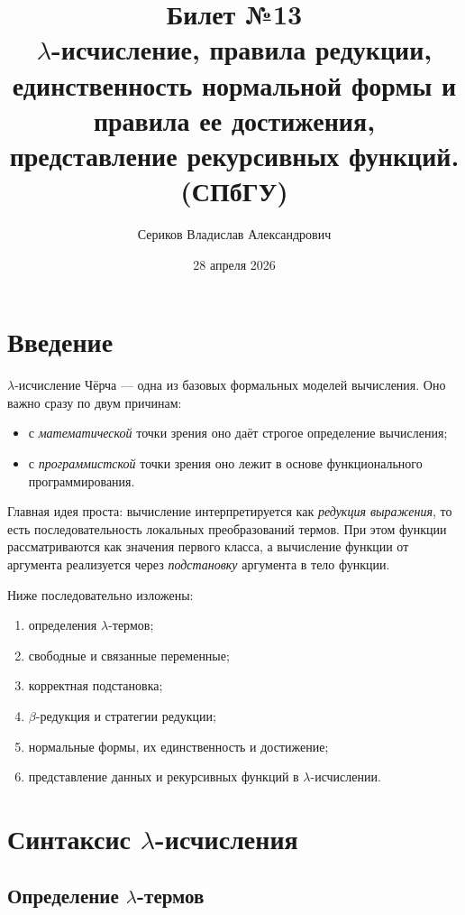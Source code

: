 \documentclass[12pt,a4paper]{article}
\title{Билет №13 \\ \small $\lambda$-исчисление, правила редукции, единственность нормальной формы и правила ее достижения, представление рекурсивных функций. (СПбГУ)}
\author{Сериков Владислав Александрович}
\date{28 апреля 2026}
\theoremstyle{remark}
\begin{document}
\maketitle
\tableofcontents
\newpage

\section*{Введение}

$\lambda$-исчисление Чёрча --- одна из базовых формальных моделей вычисления.
Оно важно сразу по двум причинам:

\begin{itemize}
    \item с \emph{математической} точки зрения оно даёт строгое определение вычисления;
    \item с \emph{программистской} точки зрения оно лежит в основе функционального программирования.
\end{itemize}

Главная идея проста: вычисление интерпретируется как \emph{редукция выражения}, то есть последовательность локальных преобразований термов.
При этом функции рассматриваются как значения первого класса, а вычисление функции от аргумента реализуется через \emph{подстановку} аргумента в тело функции.

Ниже последовательно изложены:

\begin{enumerate}[label=\arabic*)]
    \item определения $\lambda$-термов;
    \item свободные и связанные переменные;
    \item корректная подстановка;
    \item $\beta$-редукция и стратегии редукции;
    \item нормальные формы, их единственность и достижение;
    \item представление данных и рекурсивных функций в $\lambda$-исчислении.
\end{enumerate}

\section{Синтаксис $\lambda$-исчисления}

\subsection{Определение $\lambda$-термов}
\end{document}
